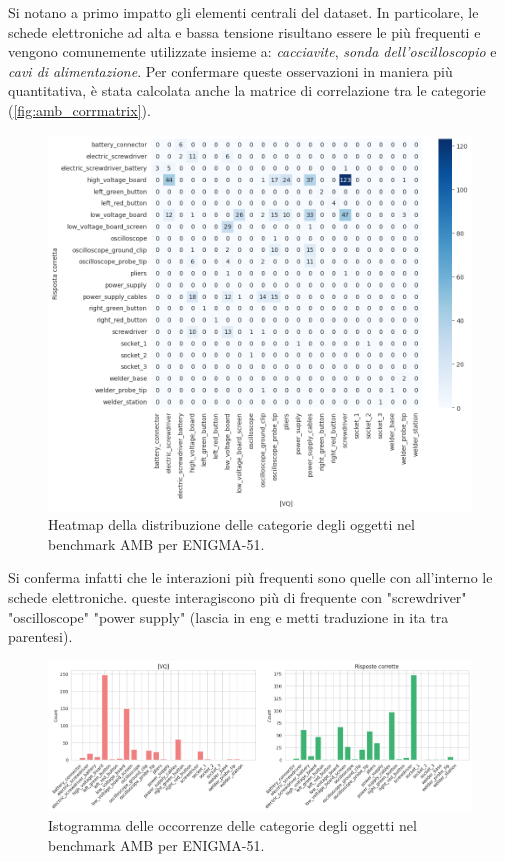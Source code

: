 Si notano a primo impatto gli elementi centrali del dataset. In particolare, le schede elettroniche ad alta e bassa tensione risultano essere le più frequenti e vengono comunemente utilizzate insieme a:
\emph{cacciavite}, \emph{sonda dell'oscilloscopio} e \emph{cavi di alimentazione}.
Per confermare queste osservazioni in maniera più quantitativa, è stata calcolata anche la matrice di correlazione tra le categorie (\autoref{fig:amb_corrmatrix}).

\begin{figure}[ht]
    \centering
    \includegraphics[width=1\linewidth]{Images/enigma_heat.png}
    \caption{Heatmap della distribuzione delle categorie degli oggetti nel benchmark AMB per ENIGMA-51.}
    \label{fig:amb_heatmap}
\end{figure}

Si conferma infatti che le interazioni più frequenti sono quelle con all'interno le schede elettroniche. queste interagiscono più di frequente con "screwdriver" "oscilloscope" "power supply" (lascia in eng e metti traduzione in ita tra parentesi).

\begin{figure}[ht]
    \centering
    \includegraphics[width=1\linewidth]{Images/enigma_hist.png}
    \caption{Istogramma delle occorrenze delle categorie degli oggetti nel benchmark AMB per ENIGMA-51.}
    \label{fig:amb_corrmatrix}
\end{figure}